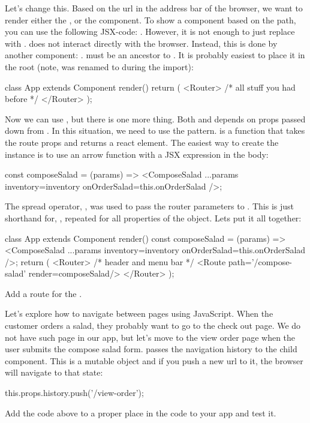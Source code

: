 \documentclass[fleqn, article, a4paper]{memoir}
\begin{document}
\begin{Assignments}
\item Let's change this. Based on the url in the address bar of the browser, we want to render either the , or the  component. To show a component based on the path, you can use the following JSX-code: . However, it is not enough to just replace  with .  does not interact directly with the browser. Instead, this is done by another component: .  must be an ancestor to . It is probably easiest to place it in the root (note,  was renamed to  during the import):
\begin{Code}
class App extends Component {
  render() {
    return (
      <Router>
        {/* all stuff you had before */}
      </Router>
    );
  }
}
\end{Code}
Now we can use , but there is one more thing. Both  and  depends on props passed down from . In this situation, we need to use the  pattern.  is a function that takes the route props and returns a react element. The easiest way to create the instance is to use an arrow function with a JSX expression in the body:
\begin{Code}
const composeSalad = (params) => <ComposeSalad {...params} inventory={inventory} 
  onOrderSalad={this.onOrderSalad} />;
\end{Code}
The spread operator, , was used to pass the router parameters to . This is just shorthand for, , repeated for all properties of the  object. Lets put it all together:
\begin{Code}
class App extends Component {
  render() {
    const composeSalad = (params) => <ComposeSalad {...params} inventory={inventory} 
                       onOrderSalad={this.onOrderSalad} />;
    return (
      <Router>
        {/* header and menu bar */}
        <Route path='/compose-salad' render={composeSalad}/>
      </Router>
    );
  }
}
\end{Code}
Add a route for the .

\item Let's explore how to navigate between pages using JavaScript. When the customer orders a salad, they probably want to go to the check out page. We do not have such page in our app, but let's move to the view order page when the user submits the compose salad form.  passes the navigation history to the child component. This is a mutable object and if you push a new url to it, the browser will navigate to that state:
\begin{Code}
this.props.history.push('/view-order');
\end{Code}
Add the code above to a proper place in the code to your app and test it.


\end{Assignments}
\end{document}
